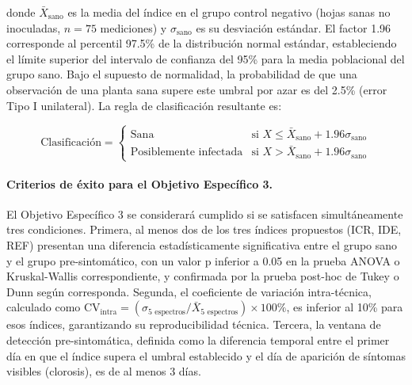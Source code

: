 \documentclass[12pt, a4paper]{article}
\begin{document}
	donde $\bar{X}_{\text{sano}}$ es la media del índice en el grupo control negativo (hojas sanas no inoculadas, $n=75$ mediciones) y $\sigma_{\text{sano}}$ es su desviación estándar. El factor 1.96 corresponde al percentil 97.5\% de la distribución normal estándar, estableciendo el límite superior del intervalo de confianza del 95\% para la media poblacional del grupo sano. Bajo el supuesto de normalidad, la probabilidad de que una observación de una planta sana supere este umbral por azar es del 2.5\% (error Tipo I unilateral). La regla de clasificación resultante es:
	
	\begin{equation}
		\text{Clasificación} = 
		\begin{cases}
			\text{Sana} & \text{si } X \leq \bar{X}_{\text{sano}} + 1.96\sigma_{\text{sano}} \\
			\text{Posiblemente infectada} & \text{si } X > \bar{X}_{\text{sano}} + 1.96\sigma_{\text{sano}}
		\end{cases}
	\end{equation}
	
	\paragraph{Criterios de éxito para el Objetivo Específico 3.}
	El Objetivo Específico 3 se considerará cumplido si se satisfacen simultáneamente tres condiciones. Primera, al menos dos de los tres índices propuestos (ICR, IDE, REF) presentan una diferencia estadísticamente significativa entre el grupo sano y el grupo pre-sintomático, con un valor p inferior a 0.05 en la prueba ANOVA o Kruskal-Wallis correspondiente, y confirmada por la prueba post-hoc de Tukey o Dunn según corresponda. Segunda, el coeficiente de variación intra-técnica, calculado como $\text{CV}_{\text{intra}} = (\sigma_{\text{5 espectros}} / \bar{X}_{\text{5 espectros}}) \times 100\%$, es inferior al 10\% para esos índices, garantizando su reproducibilidad técnica. Tercera, la ventana de detección pre-sintomática, definida como la diferencia temporal entre el primer día en que el índice supera el umbral establecido y el día de aparición de síntomas visibles (clorosis), es de al menos 3 días.
	
\end{document}
